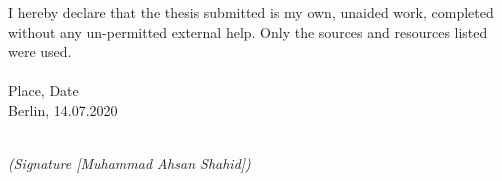 \newpage

\thispagestyle{empty}

\begin{large}

\vspace*{6cm}

\noindent
I hereby declare that the thesis submitted is my own, unaided work, completed
without any un-permitted external help. Only the sources and resources listed were
used.
\\
\\

\noindent
Place, Date
\\

\noindent
Berlin, 14.07.2020

\vspace{3cm}

\hspace*{9cm}%
\dotfill\\
\hspace*{8.5cm}%
\textit{(Signature [Muhammad Ahsan Shahid])}

\end{large}
